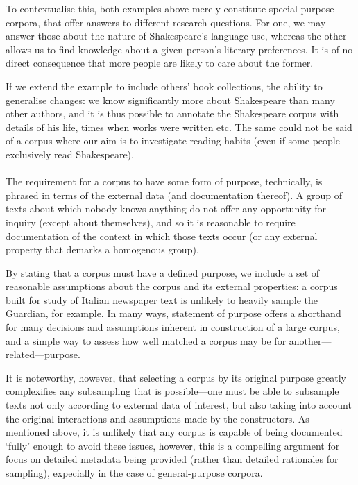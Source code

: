 To contextualise this, both examples above merely constitute special-purpose corpora, that offer answers to different research questions.  For one, we may answer those about the nature of Shakespeare's language use, whereas the other allows us to find knowledge about a given person's literary preferences.  It is of no direct consequence that more people are likely to care about the former.

If we extend the example to include others' book collections, the ability to generalise changes: we know significantly more about Shakespeare than many other authors, and it is thus possible to annotate the Shakespeare corpus with details of his life, times when works were written etc.  The same could not be said of a corpus where our aim is to investigate reading habits (even if some people exclusively read Shakespeare).

\paragraph{}
The requirement for a corpus to have some form of purpose, technically, is phrased in terms of the external data (and documentation thereof).  A group of texts about which nobody knows anything do not offer any opportunity for inquiry (except about themselves), and so it is reasonable to require documentation of the context in which those texts occur (or any external property that demarks a homogenous group).

By stating that a corpus must have a defined purpose, we include a set of reasonable assumptions about the corpus and its external properties: a corpus built for study of Italian newspaper text is unlikely to heavily sample the Guardian, for example.  In many ways, statement of purpose offers a shorthand for many decisions and assumptions inherent in construction of a large corpus, and a simple way to assess how well matched a corpus may be for another---related---purpose.

It is noteworthy, however, that selecting a corpus by its original purpose greatly complexifies any subsampling that is possible---one must be able to subsample texts not only according to external data of interest, but also taking into account the original interactions and assumptions made by the constructors.  As mentioned above, it is unlikely that any corpus is capable of being documented `fully' enough to avoid these issues, however, this is a compelling argument for focus on detailed metadata being provided (rather than detailed rationales for sampling), expecially in the case of general-purpose corpora.


